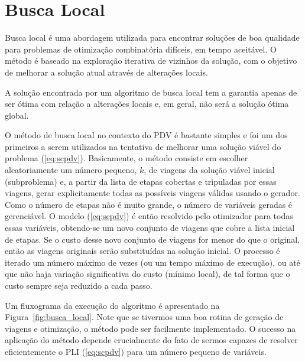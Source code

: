 \section{Busca Local}
\label{sec:metodos_busca}

Busca local é uma abordagem utilizada para encontrar soluções de boa qualidade para problemas de
otimização combinatória difíceis, em tempo aceitável. O método é baseado na exploração iterativa de
vizinhos da solução, com o objetivo de melhorar a solução atual através de alterações locais.

A solução encontrada por um algoritmo de busca local tem a garantia apenas de ser ótima com relação
a alterações locais e, em geral, não será a solução ótima global.

O método de busca local no contexto do PDV é bastante simples e foi um dos primeiros a serem
utilizados na tentativa de melhorar uma solução viável do problema (\ref{eq:scpdv}). Basicamente, o
método consiste em escolher aleatoriamente um número pequeno, $k$, de viagens da solução viável
inicial (subproblema) e, a partir da lista de etapas cobertas e tripuladas por essas viagens, gerar
explicitamente todas as possíveis viagens válidas usando o gerador. Como o número de etapas não é
muito grande, o número de variáveis geradas é gerenciável. O modelo (\ref{eq:scpdv}) é então
resolvido pelo otimizador para todas essas variáveis, obtendo-se um novo conjunto de viagens que
cobre a lista inicial de etapas. Se o custo desse novo conjunto de viagens for menor do que o
original, então as viagens originais serão substituídas na solução inicial. O processo é iterado um
número máximo de vezes (ou um tempo máximo de execução), ou até que não haja variação significativa
do custo (mínimo local), de tal forma que o custo sempre seja reduzido a cada passo.

Um fluxograma da execução do algoritmo é apresentado na Figura~\ref{fig:busca_local}. Note que se
tivermos uma boa rotina de geração de viagens e otimização, o método pode ser facilmente 
implementado. O sucesso na aplicação do método depende crucialmente do fato de sermos capazes de 
resolver eficientemente o PLI (\ref{eq:scpdv}) para um número pequeno de variáveis.

